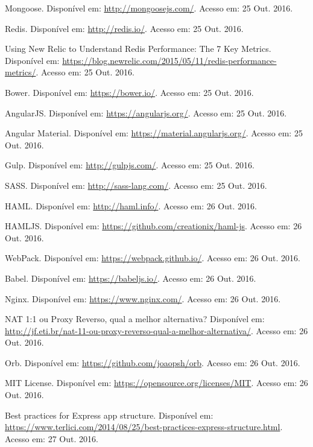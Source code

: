 \documentclass[brazil,ruledheader]{abntifes}
\begin{document}
\begin{thebibliography}{9}
		Mongoose. Disponível em: \url{http://mongoosejs.com/}.
		Acesso em: 25 Out. 2016.
		
		Redis. Disponível em: \url{http://redis.io/}.
		Acesso em: 25 Out. 2016.
		
		Using New Relic to Understand Redis Performance: The 7 Key Metrics. Disponível em: \url{https://blog.newrelic.com/2015/05/11/redis-performance-metrics/}.
		Acesso em: 25 Out. 2016.
		
		Bower. Disponível em: \url{https://bower.io/}.
		Acesso em: 25 Out. 2016.
		
		AngularJS. Disponível em: \url{https://angularjs.org/}.
		Acesso em: 25 Out. 2016.
		
		Angular Material. Disponível em: \url{https://material.angularjs.org/}.
		Acesso em: 25 Out. 2016.
		
		Gulp. Disponível em: \url{http://gulpjs.com/}.
		Acesso em: 25 Out. 2016.
		
		SASS. Disponível em: \url{http://sass-lang.com/}.
		Acesso em: 25 Out. 2016.
		
		HAML. Disponível em: \url{http://haml.info/}.
		Acesso em: 26 Out. 2016.
		
		HAMLJS. Disponível em: \url{https://github.com/creationix/haml-js}.
		Acesso em: 26 Out. 2016.
		
		WebPack. Disponível em: \url{https://webpack.github.io/}.
		Acesso em: 26 Out. 2016.
		
		Babel. Disponível em: \url{https://babeljs.io/}.
		Acesso em: 26 Out. 2016.
		
		Nginx. Disponível em: \url{https://www.nginx.com/}.
		Acesso em: 26 Out. 2016.
		
		NAT 1:1 ou Proxy Reverso, qual a melhor alternativa? Disponível em: \url{http://jf.eti.br/nat-11-ou-proxy-reverso-qual-a-melhor-alternativa/}.
		Acesso em: 26 Out. 2016.
		
		Orb. Disponível em: \url{https://github.com/joaopsh/orb}.
		Acesso em: 26 Out. 2016.
		
		MIT License. Disponível em: \url{https://opensource.org/licenses/MIT}.
		Acesso em: 26 Out. 2016.
		
		Best practices for Express app structure. Disponível em: \url{https://www.terlici.com/2014/08/25/best-practices-express-structure.html}.
		Acesso em: 27 Out. 2016.
		

\end{thebibliography}
\end{document}
